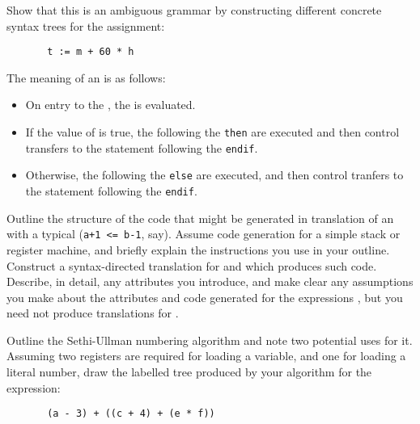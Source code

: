 \begin{subquestions}
\subsubquestion
Show that this is an ambiguous grammar by constructing different
concrete syntax trees for the assignment: 
\begin{verbatim}
       t := m + 60 * h
\end{verbatim}
\subquestion
The meaning of an  is as follows:
\begin{itemize}
\item On entry to the , the  is 
        evaluated. 
\item If the value of  is true,
        the  following the \verb"then" are
        executed and then control transfers to the statement following
        the \verb"endif". 
\item Otherwise, the  following the \verb"else" are
        executed,
        and then control tranfers to the statement following
        the \verb"endif".
\end{itemize}
\begin{subsubquestions}
\subsubquestion
	Outline the structure of the
        code that might be generated in translation of
        an  with a typical  (\verb"a+1 <= b-1", say). 
	Assume code generation for a simple
        stack or register machine, and briefly explain the
	instructions you use in your outline.
\subsubquestion
        Construct a syntax-directed translation for 
         and  which produces such code.
        Describe, in detail, any attributes you
        introduce, and make clear any assumptions you make about 
        the attributes and code generated for the
        expressions , but you need not produce translations for
	.
\end{subsubquestions}

\subquestion
Outline the Sethi-Ullman numbering algorithm and
note two potential uses for it.  Assuming two registers
are required for loading a variable, and one for loading a literal number,
draw the labelled
tree produced by your algorithm for the expression:
\begin{verbatim}
       (a - 3) + ((c + 4) + (e * f))
\end{verbatim}

\end{subquestions}

